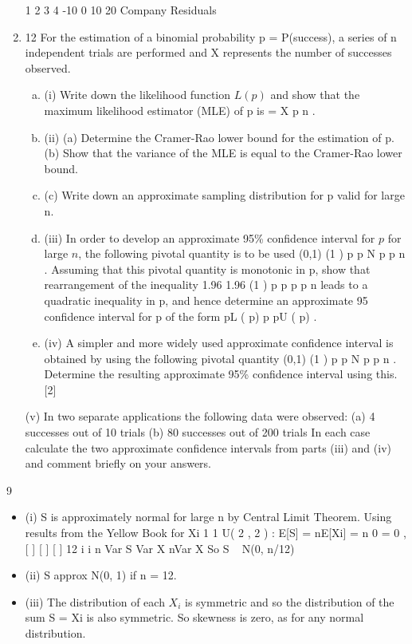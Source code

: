 \documentclass[a4paper,12pt]{article}
\begin{document}
\begin{enumerate}
1 2 3 4
-10
0
10
20
Company
Residuals
\item 12 For the estimation of a binomial probability p = P(success), a series of n independent
trials are performed and X represents the number of successes observed.
\begin{enumerate}[(a)]
    \item (i) Write down the likelihood function $L(p)$ and show that the maximum
likelihood estimator (MLE) of p is =
X
p
n
.

    \item (ii) (a) Determine the Cramer-Rao lower bound for the estimation of p.
(b) Show that the variance of the MLE is equal to the Cramer-Rao lower
bound.
    \item (c) Write down an approximate sampling distribution for p valid for
large n.
    \item (iii) In order to develop an approximate 95\% confidence interval for $p$ for large $n$,
the following pivotal quantity is to be used
(0,1)
(1 )
p p
N
p p
n
.
Assuming that this pivotal quantity is monotonic in p, show that rearrangement
of the inequality
1.96 1.96
(1 )
p p
p p
n
leads to a quadratic inequality in p, and hence determine an approximate 95%
confidence interval for p of the form pL ( p) p pU ( p) .

    \item (iv) A simpler and more widely used approximate confidence interval is obtained
by using the following pivotal quantity
(0,1)
(1 )
p p
N
p p
n
.
Determine the resulting approximate 95\% confidence interval using this. [2]
\end{enumerate}


(v) In two separate applications the following data were observed:
(a) 4 successes out of 10 trials
(b) 80 successes out of 200 trials
In each case calculate the two approximate confidence intervals from parts
(iii) and (iv) and comment briefly on your answers.
\end{enumerate}
\newpage
9 
\begin{itemize}
    \item (i) S is approximately normal for large n by Central Limit Theorem.
Using results from the Yellow Book for Xi
1 1
U( 2 , 2 ) :
E[S] = nE[Xi] = n 0 = 0 , [ ] [ ] [ ]
12 i i
n
Var S Var X nVar X
So S ~ N(0, n/12)
\item (ii) S approx N(0, 1) if n = 12.
\item (iii) The distribution of each $X_i$ is symmetric and so the distribution of the sum
S = Xi is also symmetric. So skewness is zero, as for any normal distribution.
\end{itemize}
\end{document}
